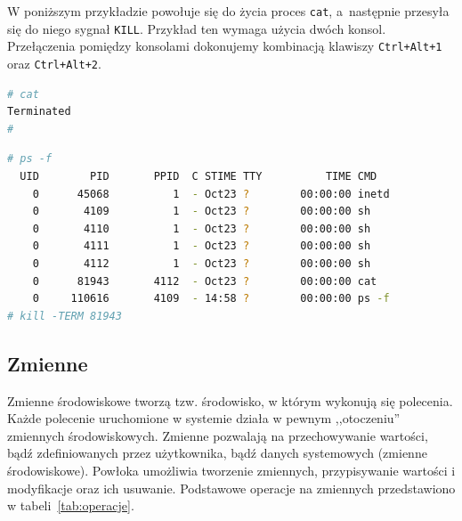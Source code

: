 \documentclass[11pt,twoside,a4paper]{article}
\begin{document}
\begin{example}
 
W poniższym przykładzie powołuje się do życia proces \lstinline{cat}, a~następnie przesyła się do niego sygnał \lstinline{KILL}. Przykład ten wymaga użycia dwóch konsol. Przełączenia pomiędzy konsolami dokonujemy kombinacją klawiszy \lstinline{Ctrl+Alt+1} oraz \lstinline{Ctrl+Alt+2}.
 
\begin{lstlisting}[language=bash,caption=Konsola 1] 
# cat
Terminated
# 
\end{lstlisting} 

\begin{lstlisting}[language=bash,caption=Konsola 2,deletekeywords={cat,ps}] 
# ps -f 
  UID        PID       PPID  C STIME TTY          TIME CMD
    0      45068          1  - Oct23 ?        00:00:00 inetd
    0       4109          1  - Oct23 ?        00:00:00 sh
    0       4110          1  - Oct23 ?        00:00:00 sh
    0       4111          1  - Oct23 ?        00:00:00 sh
    0       4112          1  - Oct23 ?        00:00:00 sh
    0      81943       4112  - Oct23 ?        00:00:00 cat
    0     110616       4109  - 14:58 ?        00:00:00 ps -f
# kill -TERM 81943
\end{lstlisting}

\end{example} 



\subsection{Zmienne}

Zmienne środowiskowe tworzą tzw. środowisko, w którym wykonują się polecenia. Każde polecenie uruchomione w systemie działa w pewnym ,,otoczeniu'' zmiennych środowiskowych. Zmienne pozwalają na przechowywanie wartości, bądź zdefiniowanych przez użytkownika, bądź danych systemowych (zmienne środowiskowe). Powłoka umożliwia tworzenie zmiennych, przypisywanie wartości i modyfikacje oraz ich usuwanie. Podstawowe operacje na zmiennych przedstawiono w tabeli~\ref{tab:operacje}. 
\end{document}
